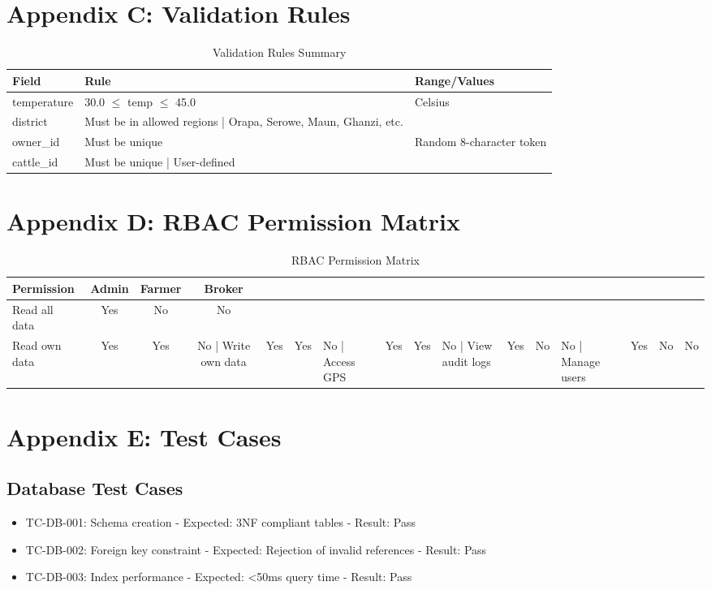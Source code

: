 \section*{Appendix C: Validation Rules}

\begin{table}[H]
\centering
\begin{tabular}{|l|l|l|}
\hline
\textbf{Field} & \textbf{Rule} & \textbf{Range/Values} \\
\hline
temperature & 30.0 $\leq$ temp $\leq$ 45.0 & Celsius \\
district & Must be in allowed regions | Orapa, Serowe, Maun, Ghanzi, etc. \\
owner\_id & Must be unique & Random 8-character token \\
cattle\_id & Must be unique | User-defined \\
\hline
\end{tabular}
\caption{Validation Rules Summary}
\end{table}

\section*{Appendix D: RBAC Permission Matrix}

\begin{table}[H]
\centering
\begin{tabular}{|l|c|c|c|}
\hline
\textbf{Permission} & \textbf{Admin} & \textbf{Farmer} & \textbf{Broker} \\
\hline
Read all data & Yes & No & No \\
Read own data & Yes & Yes & No |
Write own data & Yes & Yes & No |
Access GPS & Yes & Yes & No |
View audit logs & Yes & No & No |
Manage users & Yes & No & No \\
\hline
\end{tabular}
\caption{RBAC Permission Matrix}
\end{table}

\section*{Appendix E: Test Cases}

\subsection*{Database Test Cases}
\begin{itemize}
    \item TC-DB-001: Schema creation - Expected: 3NF compliant tables - Result: Pass
    \item TC-DB-002: Foreign key constraint - Expected: Rejection of invalid references - Result: Pass
    \item TC-DB-003: Index performance - Expected: <50ms query time - Result: Pass
\end{itemize}

